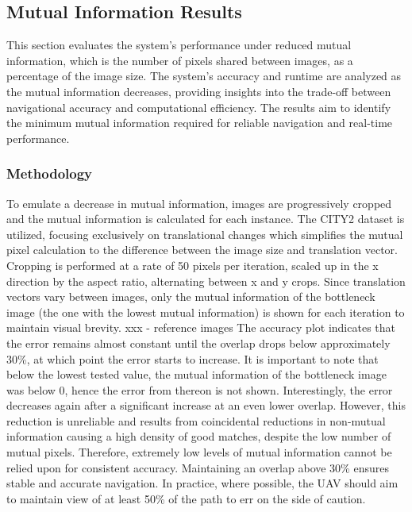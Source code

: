 \subsection{Mutual Information Results}

This section evaluates the system's performance under reduced mutual information, which is the number of pixels shared between images, as a percentage of the image size. The system's accuracy and runtime are analyzed as the mutual information decreases, providing insights into the trade-off between navigational accuracy and computational efficiency. The results aim to identify the minimum mutual information required for reliable navigation and real-time performance.

\subsubsection{Methodology}

To emulate a decrease in mutual information, images are progressively cropped and the mutual information is calculated for each instance. The CITY2 dataset is utilized, focusing exclusively on translational changes which simplifies the mutual pixel calculation to the difference between the image size and translation vector. Cropping is performed at a rate of 50 pixels per iteration, scaled up in the x direction by the aspect ratio, alternating between x and y crops. Since translation vectors vary between images, only the mutual information of the bottleneck image (the one with the lowest mutual information) is shown for each iteration to maintain visual brevity.
xxx - reference images 
The accuracy plot indicates that the error remains almost constant until the overlap drops below approximately 30\%, at which point the error starts to increase. It is important to note that below the lowest tested value, the mutual information of the bottleneck image was below 0, hence the error from thereon is not shown. Interestingly, the error decreases again after a significant increase at an even lower overlap. However, this reduction is unreliable and results from coincidental reductions in non-mutual information causing a high density of good matches, despite the low number of mutual pixels. Therefore, extremely low levels of mutual information cannot be relied upon for consistent accuracy. Maintaining an overlap above 30\% ensures stable and accurate navigation. In practice, where possible, the UAV should aim to maintain view of at least 50\% of the path to err on the side of caution. 

